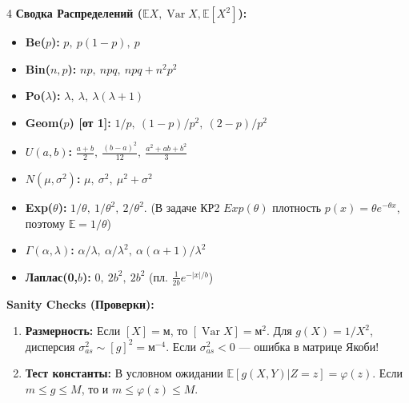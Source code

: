\documentclass[8pt, a4paper, landscape]{extarticle}
\newcommand{\E}{\mathbb{E}}
\DeclareMathOperator{\Var}{Var}
\begin{document}
\begin{multicols*}{4}
\textbf{Сводка Распределений ($\E X, \Var X, \E[X^2]$):}
\begin{itemize}
    \item \textbf{Be($p$):} $p, \ p(1-p), \ p$
    \item \textbf{Bin($n,p$):} $np, \ npq, \ npq+n^2p^2$
    \item \textbf{Po($\lambda$):} $\lambda, \ \lambda, \ \lambda(\lambda+1)$
    \item \textbf{Geom($p$) [от 1]:} $1/p, \ (1-p)/p^2, \ (2-p)/p^2$
    \item \textbf{$U(a,b)$:} $\frac{a+b}{2}, \ \frac{(b-a)^2}{12}, \ \frac{a^2+ab+b^2}{3}$
    \item \textbf{$N(\mu,\sigma^2)$:} $\mu, \ \sigma^2, \ \mu^2+\sigma^2$
    \item \textbf{Exp($\theta$):} $1/\theta, \ 1/\theta^2, \ 2/\theta^2$. (В задаче КР2 $Exp(\theta)$ плотность $p(x)=\theta e^{-\theta x}$, поэтому $\E=1/\theta$)
    \item \textbf{$\Gamma(\alpha,\lambda)$:} $\alpha/\lambda, \ \alpha/\lambda^2, \ \alpha(\alpha+1)/\lambda^2$
    \item \textbf{Лаплас(0,$b$):} $0, \ 2b^2, \ 2b^2$ \quad (пл. $\frac{1}{2b}e^{-|x|/b}$)
\end{itemize}

\textbf{Sanity Checks (Проверки):}
\begin{enumerate}
    \item \textbf{Размерность:} Если $[X]\!=\!\text{м}$, то $[\Var X]\!=\!\text{м}^2$. Для $g(X)\!=\!1/X^2$, дисперсия $\sigma_{as}^2 \sim [g]^2 \!=\! \text{м}^{-4}$. Если $\sigma_{as}^2<0$ --- ошибка в матрице Якоби!
    \item \textbf{Тест константы:} В условном ожидании $\E[g(X,Y)|Z=z] = \varphi(z)$. Если $m \le g \le M$, то и $m \le \varphi(z) \le M$.
\end{enumerate}

\end{multicols*}
\end{document}
